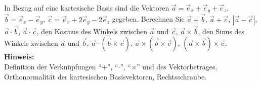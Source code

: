 \begin{question}[section=1,subsection=12,name={Elementare Vektoralgebra},difficulty=3,type=exercise,tags={20110509}]
In Bezug auf eine kartesische Basis sind die Vektoren
$\vec a = \vec e_x + \vec e_y + \vec e_z$, $\vec b = \vec e_x - \vec e_y$, $\vec c = \vec e_x + 2 \vec e_y - 2 \vec e_z$ 
gegeben. Berechnen Sie $ \vec a + \vec b$, $ \vec a + \vec c$, $| \vec a - \vec c |$, $\vec a \cdot \vec b$, $ \vec a \cdot \vec c$, den Kosinus des Winkels zwischen $\vec a$ und $\vec c$, $ \vec a \times \vec b$, den Sinus des Winkels zwischen $\vec a$ und $\vec b$, $\vec a \cdot (\vec b \times \vec c)$, $\vec a \times ( \vec b \times \vec c)$, $(\vec a \times \vec b ) \times \vec c$.
\\ \textbf{Hinweis:}\\
Definition der Verkn\"upfungen ``+'', ``$\cdot$'', ``$\times$''  und des Vektorbetrages. Orthonormalit\"at der kartesischen Basisvektoren, Rechtsschraube.
\end{question}
